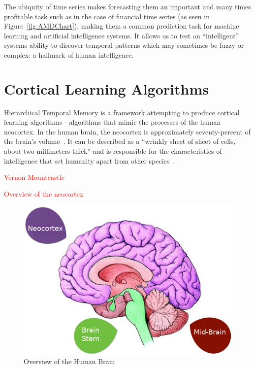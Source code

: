 \documentclass[oneside,12pt,openany]{book}
\begin{document}
	The ubiquity of time series makes forecasting them an important and many times profitable task such as in the case of financial time series (as seen in Figure~\ref{fig:AMDChart}), making them a common prediction task for machine learning and artificial intelligence systems. It allows us to test an ``intelligent'' systems ability to discover temporal patterns which may sometimes be fuzzy or complex: a hallmark of human intelligence.
	
	
	
	
	
	
	
	\chapter{Cortical Learning Algorithms}
	
	Hierarchical Temporal Memory is a framework attempting to produce cortical learning algorithms---algorithms that mimic the processes of the human neocortex. In the human brain, the neocortex is approximately seventy-percent of the brain's volume~\cite{DiscoveriesBrainWorks}. It can be described as a ``wrinkly sheet of sheet of cells, about two millimeters thick'' and is responsible for the characteristics of intelligence that set humanity apart from other species~\cite{DiscoveriesBrainWorks}. 
	
	\textcolor{red}{Vernon Mountcastle}
	
	\textcolor{red}{Overview of the neocortex}
	
	\begin{figure}[!ht]
		\centering
		\includegraphics[width=\linewidth]{images/Brain.png}
		\caption{Overview of the Human Brain}
		\label{fig:brain}
	\end{figure}
	
\end{document}
